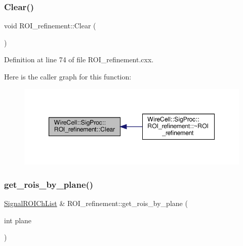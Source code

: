 \subsubsection{\texorpdfstring{Clear()}{Clear()}}
{\footnotesize\ttfamily void R\+O\+I\+\_\+refinement\+::\+Clear (\begin{DoxyParamCaption}{ }\end{DoxyParamCaption})}



Definition at line 74 of file R\+O\+I\+\_\+refinement.\+cxx.

Here is the caller graph for this function\+:
\nopagebreak
\begin{figure}[H]
\begin{center}
\leavevmode
\includegraphics[width=347pt]{class_wire_cell_1_1_sig_proc_1_1_r_o_i__refinement_a022c40a41ac572f1864dbd345c04159d_icgraph}
\end{center}
\end{figure}
\mbox{\label{class_wire_cell_1_1_sig_proc_1_1_r_o_i__refinement_afd5ab2626265ce9d6efd309bfeec3639}} 
\subsubsection{\texorpdfstring{get\+\_\+rois\+\_\+by\+\_\+plane()}{get\_rois\_by\_plane()}}
{\footnotesize\ttfamily \hyperlink{namespace_wire_cell_1_1_sig_proc_a5b3db127bb7fb1e16d93fa60f52905af}{Signal\+R\+O\+I\+Ch\+List} \& R\+O\+I\+\_\+refinement\+::get\+\_\+rois\+\_\+by\+\_\+plane (\begin{DoxyParamCaption}\item[{int}]{plane }\end{DoxyParamCaption})}



